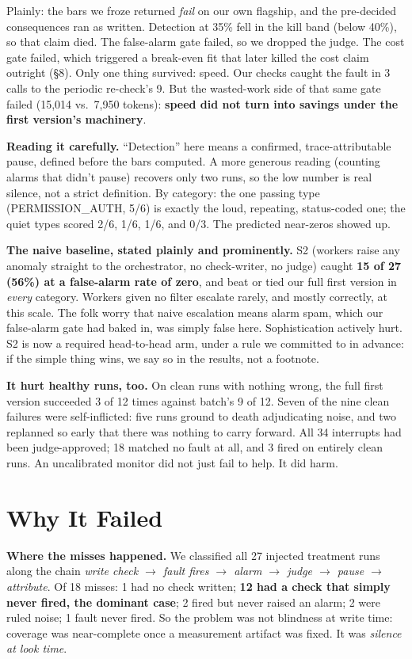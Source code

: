 \documentclass[acmsmall,screen]{acmart}
\begin{document}
Plainly: the bars we froze returned \emph{fail} on our own flagship, and the
pre-decided consequences ran as written. Detection at 35\% fell in the kill
band (below 40\%), so that claim died. The false-alarm gate failed, so we
dropped the judge. The cost gate failed, which triggered a break-even fit that
later killed the cost claim outright (\S8). Only one thing survived: speed. Our
checks caught the fault in 3 calls to the periodic re-check's 9. But the
wasted-work side of that same gate failed (15,014 vs.\ 7,950 tokens):
\textbf{speed did not turn into savings under the first version's machinery}.

\textbf{Reading it carefully.} ``Detection'' here means a confirmed,
trace-attributable pause, defined before the bars computed. A more generous
reading (counting alarms that didn't pause) recovers only two runs, so the low
number is real silence, not a strict definition. By category: the one passing
type (PERMISSION\_AUTH, 5/6) is exactly the loud, repeating, status-coded one;
the quiet types scored 2/6, 1/6, 1/6, and 0/3. The predicted near-zeros showed
up.

\textbf{The naive baseline, stated plainly and prominently.} S2 (workers raise
any anomaly straight to the orchestrator, no check-writer, no judge) caught
\textbf{15 of 27 (56\%) at a false-alarm rate of zero}, and beat or tied our
full first version in \emph{every} category. Workers given no filter escalate
rarely, and mostly correctly, at this scale. The folk worry that naive
escalation means alarm spam, which our false-alarm gate had baked in, was
simply false here. Sophistication actively hurt. S2 is now a required
head-to-head arm, under a rule we committed to in advance: if the simple thing
wins, we say so in the results, not a footnote.

\textbf{It hurt healthy runs, too.} On clean runs with nothing wrong, the full
first version succeeded 3 of 12 times against batch's 9 of 12. Seven of the nine
clean failures were self-inflicted: five runs ground to death adjudicating
noise, and two replanned so early that there was nothing to carry forward. All
34 interrupts had been judge-approved; 18 matched no fault at all, and 3 fired
on entirely clean runs. An uncalibrated monitor did not just fail to help. It
did harm.

\section{Why It Failed}
\textbf{Where the misses happened.} We classified all 27 injected treatment
runs along the chain \emph{write check $\rightarrow$ fault fires $\rightarrow$
alarm $\rightarrow$ judge $\rightarrow$ pause $\rightarrow$ attribute}. Of 18
misses: 1 had no check written; \textbf{12 had a check that simply never
fired, the dominant case}; 2 fired but never raised an alarm; 2 were ruled
noise; 1 fault never fired. So the problem was not blindness at write
time: coverage was near-complete once a measurement artifact was fixed. It was
\emph{silence at look time}.
\end{document}
